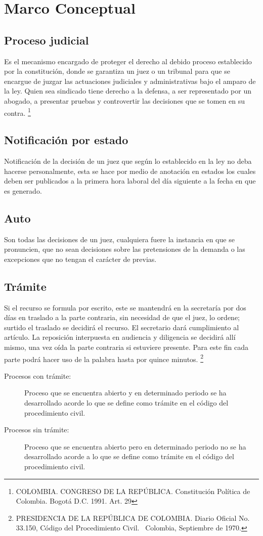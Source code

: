 \section{Marco Conceptual}
\subsection{Proceso judicial}
Es el mecanismo encargado de proteger el derecho al debido proceso 
establecido por la constituci\'on, donde se garantiza un juez o un 
tribunal para que se encargue de juzgar las actuaciones judiciales y 
administrativas bajo el amparo de la ley. Quien sea sindicado tiene 
derecho a la defensa, a ser representado por un abogado, a presentar 
pruebas y controvertir las decisiones que se tomen en su contra.
\footnote{COLOMBIA. CONGRESO DE LA REP\'UBLICA. Constituci\'on Pol\'itica de Colombia. Bogot\'a D.C. 1991. Art. 29}


\subsection{Notificaci\'on por estado} 
Notificaci\'on de la decisi\'on de un juez que seg\'un lo establecido en la 
ley no deba hacerse personalmente, esta se hace por medio de anotaci\'on 
en estados los cuales deben ser publicados a la primera hora laboral 
del d\'ia siguiente a la fecha en que es generado.

\subsection{Auto}
Son todas las decisiones de un juez, cualquiera fuere la instancia en 
que se pronuncien, que no sean decisiones sobre las pretensiones de
la demanda o las excepciones que no tengan el car\'acter de previas.

\subsection{Tr\'amite} Si el recurso se formula por escrito, este se mantendr\'a en la secretar\'ia por dos d\'ias en traslado a la parte contraria, sin necesidad de que el juez, lo ordene; surtido el traslado se decidir\'a el recurso. El secretario dar\'a cumplimiento al art\'iculo.
La reposici\'on interpuesta en audiencia y diligencia se decidir\'a all\'i mismo, una vez o\'ida la parte contraria si estuviere presente. Para este fin cada parte podr\'a hacer uso de la palabra hasta por quince minutos. \footnote{PRESIDENCIA DE LA REP\'UBLICA DE COLOMBIA. Diario Oficial No. 33.150, C\'odigo del Procedimiento Civil.  Colombia, Septiembre de 1970.}
\begin{description}
\item[Procesos con tr\'amite:] Proceso que se encuentra abierto y en 
determinado periodo se ha desarrollado acorde lo que  se define como 
tr\'amite en el c\'odigo del procedimiento civil.

\item[Procesos sin tr\'amite:] Proceso que se encuentra abierto pero en 
determinado periodo no se ha desarrollado acorde a lo que se define 
como tr\'amite en el c\'odigo del procedimiento civil.
\end{description}

